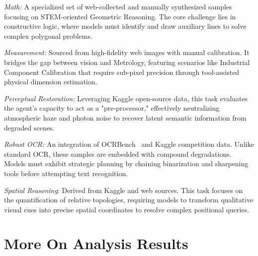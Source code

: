\documentclass[runningheads]{llncs}
\begin{document}
\textit{Math:} A specialized set of web-collected and manually synthesized samples focusing on STEM-oriented Geometric Reasoning. The core challenge lies in constructive logic, where models must identify and draw auxiliary lines to solve complex polygonal problems.

\textit{Measurement:} Sourced from high-fidelity web images with manual calibration. It bridges the gap between vision and Metrology, featuring scenarios like Industrial Component Calibration that require sub-pixel precision through tool-assisted physical dimension estimation.

\textit{Perceptual Restoration:} Leveraging Kaggle open-source data, this task evaluates the agent’s capacity to act as a "pre-processor," effectively neutralizing atmospheric haze and photon noise to recover latent semantic information from degraded scenes.

\textit{Robust OCR:} An integration of OCRBench~\cite{liu2024ocrbench} and Kaggle competition data. Unlike standard OCR, these samples are embedded with compound degradations. Models must exhibit strategic planning by chaining binarization and sharpening tools before attempting text recognition. 

\textit{Spatial Reasoning}: Derived from Kaggle and web sources. This task focuses on the quantification of relative topologies, requiring models to transform qualitative visual cues into precise spatial coordinates to resolve complex positional queries.

\section{More On Analysis Results}
\end{document}
